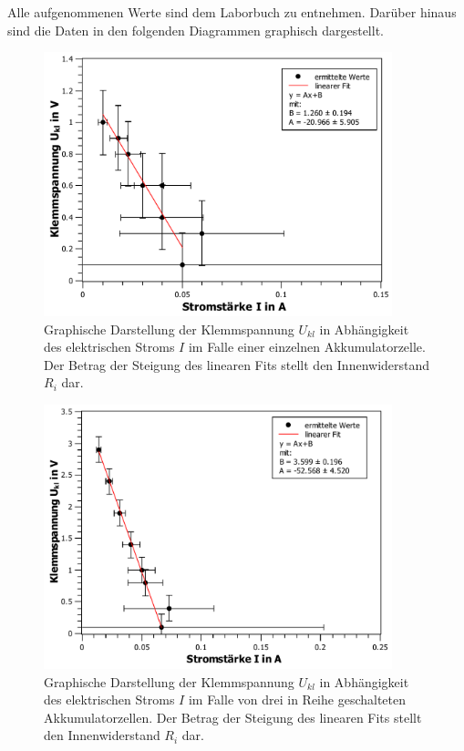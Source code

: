 Alle aufgenommenen Werte sind dem Laborbuch zu entnehmen. 
Darüber hinaus sind die Daten in den folgenden Diagrammen graphisch dargestellt.
\begin{figure}[ht]
	\centering
	\includegraphics[width=0.9\textwidth]{auswertung/I-U1.pdf}
	\caption{Graphische Darstellung der Klemmspannung $U_{kl}$ in Abhängigkeit des elektrischen Stroms $I$ im Falle einer einzelnen Akkumulatorzelle. Der Betrag der Steigung des linearen Fits stellt den Innenwiderstand $R_i$ dar.}
	\label{fig:IU1}	
\end{figure}
\begin{figure}[ht]
	\centering
	\includegraphics[width=0.9\textwidth]{auswertung/I-U2.pdf}
	\caption{Graphische Darstellung der Klemmspannung $U_{kl}$ in Abhängigkeit des elektrischen Stroms $I$ im Falle von drei in Reihe geschalteten Akkumulatorzellen. Der Betrag der Steigung des linearen Fits stellt den Innenwiderstand $R_i$ dar.}
	\label{fig:IU2}	
\end{figure}
